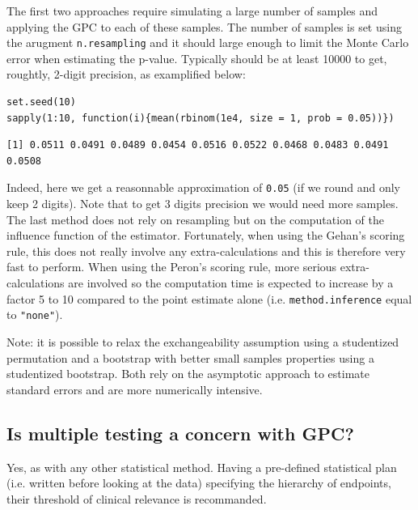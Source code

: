 \documentclass[12pt]{article}
\begin{document}
The first two approaches require simulating a large number of samples
and applying the GPC to each of these samples. The number of samples
is set using the arugment \texttt{n.resampling} and it should large enough to
limit the Monte Carlo error when estimating the p-value. Typically
should be at least 10000 to get, roughtly, 2-digit precision, as
examplified below:
\lstset{language=r,label= ,caption= ,captionpos=b,numbers=none}
\begin{lstlisting}
set.seed(10)
sapply(1:10, function(i){mean(rbinom(1e4, size = 1, prob = 0.05))})
\end{lstlisting}

\begin{verbatim}
[1] 0.0511 0.0491 0.0489 0.0454 0.0516 0.0522 0.0468 0.0483 0.0491 0.0508
\end{verbatim}

Indeed, here we get a reasonnable approximation of \texttt{0.05} (if we round
and only keep 2 digits). Note that to get 3 digits precision we would
need more samples. The last method does not rely on resampling but on
the computation of the influence function of the
estimator. Fortunately, when using the Gehan's scoring rule, this does
not really involve any extra-calculations and this is therefore very
fast to perform. When using the Peron's scoring rule, more serious
extra-calculations are involved so the computation time is expected to
increase by a factor 5 to 10 compared to the point estimate alone
(i.e. \texttt{method.inference} equal to \texttt{"none"}).

\bigskip

Note: it is possible to relax the exchangeability assumption using a
studentized permutation and a bootstrap with better small samples
properties using a studentized bootstrap. Both rely on the asymptotic
approach to estimate standard errors and are more numerically
intensive.

\clearpage

\subsection{Is multiple testing a concern with GPC?}
\label{sec:orgccb2522}

Yes, as with any other statistical method. Having a pre-defined
statistical plan (i.e. written before looking at the data) specifying
the hierarchy of endpoints, their threshold of clinical relevance is
recommanded. 

\bigskip
\end{document}
